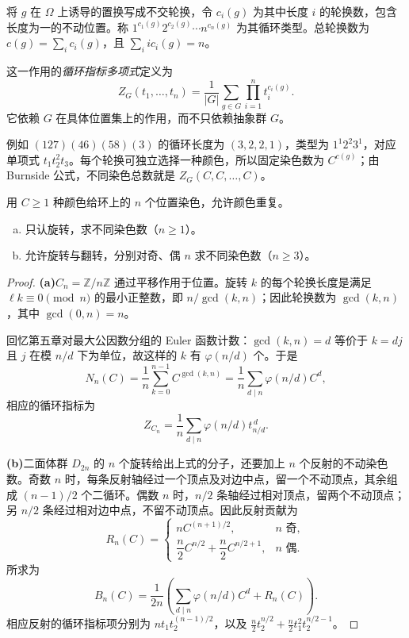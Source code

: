 \documentclass[lang=cn,a4paper,fontset=none,zihao=false,10pt,openany,twoside]{beautybook}
\numberwithin{algorithm}{chapter}
\begin{document}
\begin{definition}[循环类型与循环指标]\label{def:cycle-index}
将 $g$ 在 $\Omega$ 上诱导的置换写成不交轮换，令 $c_i(g)$ 为其中长度 $i$ 的轮换数，包含长度为一的不动位置。称 $1^{c_1(g)}2^{c_2(g)}\cdots n^{c_n(g)}$ 为其循环类型。总轮换数为 $c(g)=\sum_i c_i(g)$，且 $\sum_i i c_i(g)=n$。

这一作用的\emph{循环指标多项式}定义为
\[
 Z_G(t_1,\ldots,t_n)=\frac1{|G|}\sum_{g\in G}\prod_{i=1}^n t_i^{c_i(g)}.
\]
它依赖 $G$ 在具体位置集上的作用，而不只依赖抽象群 $G$。
\end{definition}
例如 $(127)(46)(58)(3)$ 的循环长度为 $(3,2,2,1)$，类型为 $1^1 2^2 3^1$，对应单项式 $t_1t_2^2t_3$。每个轮换可独立选择一种颜色，所以固定染色数为 $C^{c(g)}$；由 Burnside 公式，不同染色总数就是 $Z_G(C,C,\ldots,C)$。

\begin{example}[旋转项链与允许翻转的项链]\label{ex:necklace-bracelet}
用 $C\ge1$ 种颜色给环上的 $n$ 个位置染色，允许颜色重复。
\begin{enumerate}[(a)]
\item 只认旋转，求不同染色数（$n\ge1$）。
\item 允许旋转与翻转，分别对奇、偶 $n$ 求不同染色数（$n\ge3$）。
\end{enumerate}
\end{example}
\begin{proof}
\par\smallskip\noindent\textbf{(a)}\quad $C_n=\mathbb Z/n\mathbb Z$ 通过平移作用于位置。旋转 $k$ 的每个轮换长度是满足 $\ell k\equiv0\pmod n$ 的最小正整数，即 $n/\gcd(k,n)$；因此轮换数为 $\gcd(k,n)$，其中 $\gcd(0,n)=n$。

回忆第五章对最大公因数分组的 Euler 函数计数：$\gcd(k,n)=d$ 等价于 $k=dj$ 且 $j$ 在模 $n/d$ 下为单位，故这样的 $k$ 有 $\varphi(n/d)$ 个。于是
\[
 N_n(C)=\frac1n\sum_{k=0}^{n-1}C^{\gcd(k,n)}
 =\frac1n\sum_{d\mid n}\varphi(n/d)C^d,
\]
相应的循环指标为
\[
 Z_{C_n}=\frac1n\sum_{d\mid n}\varphi(n/d)t_{n/d}^{\,d}.
\]

\par\smallskip\noindent\textbf{(b)}\quad 二面体群 $D_{2n}$ 的 $n$ 个旋转给出上式的分子，还要加上 $n$ 个反射的不动染色数。奇数 $n$ 时，每条反射轴经过一个顶点及对边中点，留一个不动顶点，其余组成 $(n-1)/2$ 个二循环。偶数 $n$ 时，$n/2$ 条轴经过相对顶点，留两个不动顶点；另 $n/2$ 条经过相对边中点，不留不动顶点。因此反射贡献为
\[
 R_n(C)=\begin{cases}
 nC^{(n+1)/2},&n\text{ 奇},\\
 \dfrac n2 C^{n/2}+\dfrac n2 C^{n/2+1},&n\text{ 偶}.
 \end{cases}
\]
所求为
\[
 B_n(C)=\frac1{2n}\left(\sum_{d\mid n}\varphi(n/d)C^d+R_n(C)\right).
\]
相应反射的循环指标项分别为 $nt_1t_2^{(n-1)/2}$，以及 $\frac n2t_2^{n/2}+\frac n2t_1^2t_2^{n/2-1}$。
\end{proof}
\end{document}
